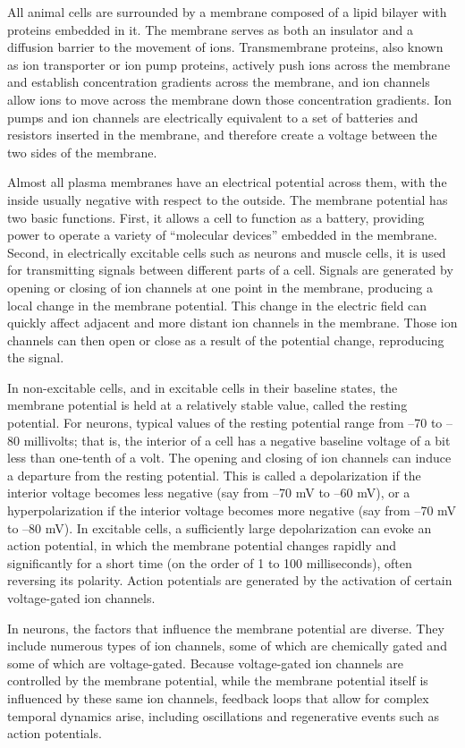All animal cells are surrounded by a membrane composed of a lipid bilayer with proteins embedded in it. The membrane serves as both an insulator and a diffusion barrier to the movement of ions. Transmembrane proteins, also known as ion transporter or ion pump proteins, actively push ions across the membrane and establish concentration gradients across the membrane, and ion channels allow ions to move across the membrane down those concentration gradients. Ion pumps and ion channels are electrically equivalent to a set of batteries and resistors inserted in the membrane, and therefore create a voltage between the two sides of the membrane.

Almost all plasma membranes have an electrical potential across them, with the inside usually negative with respect to the outside. The membrane potential has two basic functions. First, it allows a cell to function as a battery, providing power to operate a variety of ``molecular devices'' embedded in the membrane. Second, in electrically excitable cells such as neurons and muscle cells, it is used for transmitting signals between different parts of a cell. Signals are generated by opening or closing of ion channels at one point in the membrane, producing a local change in the membrane potential. This change in the electric field can quickly affect adjacent and more distant ion channels in the membrane. Those ion channels can then open or close as a result of the potential change, reproducing the signal.

In non-excitable cells, and in excitable cells in their baseline states, the membrane potential is held at a relatively stable value, called the resting potential. For neurons, typical values of the resting potential range from --70 to --80 millivolts; that is, the interior of a cell has a negative baseline voltage of a bit less than one-tenth of a volt. The opening and closing of ion channels can induce a departure from the resting potential. This is called a depolarization if the interior voltage becomes less negative (say from --70 mV to --60 mV), or a hyperpolarization if the interior voltage becomes more negative (say from --70 mV to --80 mV). In excitable cells, a sufficiently large depolarization can evoke an action potential, in which the membrane potential changes rapidly and significantly for a short time (on the order of 1 to 100 milliseconds), often reversing its polarity. Action potentials are generated by the activation of certain voltage-gated ion channels.

In neurons, the factors that influence the membrane potential are diverse. They include numerous types of ion channels, some of which are chemically gated and some of which are voltage-gated. Because voltage-gated ion channels are controlled by the membrane potential, while the membrane potential itself is influenced by these same ion channels, feedback loops that allow for complex temporal dynamics arise, including oscillations and regenerative events such as action potentials.


